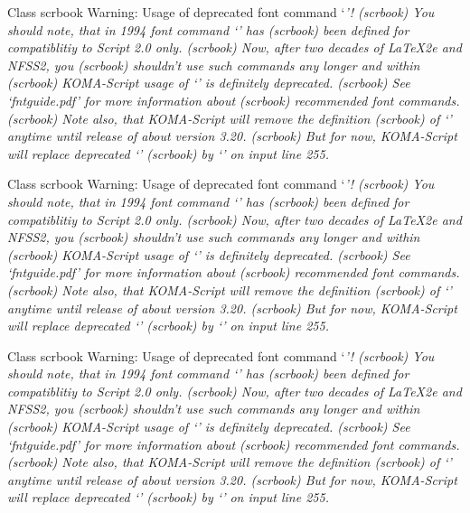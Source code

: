Class scrbook Warning: Usage of deprecated font command `\it'!
(scrbook)              You should note, that in 1994 font command `\it' has
(scrbook)              been defined for compatiblitiy to Script 2.0 only.
(scrbook)              Now, after two decades of LaTeX2e and NFSS2, you
(scrbook)              shouldn't use such commands any longer and within
(scrbook)              KOMA-Script usage of `\it' is definitely deprecated.
(scrbook)              See `fntguide.pdf' for more information about
(scrbook)              recommended font commands.
(scrbook)              Note also, that KOMA-Script will remove the definition
(scrbook)              of `\it' anytime until release of about version 3.20.
(scrbook)              But for now, KOMA-Script will replace deprecated `\it'
(scrbook)              by `\normalfont \itshape ' on input line 255.


Class scrbook Warning: Usage of deprecated font command `\it'!
(scrbook)              You should note, that in 1994 font command `\it' has
(scrbook)              been defined for compatiblitiy to Script 2.0 only.
(scrbook)              Now, after two decades of LaTeX2e and NFSS2, you
(scrbook)              shouldn't use such commands any longer and within
(scrbook)              KOMA-Script usage of `\it' is definitely deprecated.
(scrbook)              See `fntguide.pdf' for more information about
(scrbook)              recommended font commands.
(scrbook)              Note also, that KOMA-Script will remove the definition
(scrbook)              of `\it' anytime until release of about version 3.20.
(scrbook)              But for now, KOMA-Script will replace deprecated `\it'
(scrbook)              by `\normalfont \itshape ' on input line 255.


Class scrbook Warning: Usage of deprecated font command `\it'!
(scrbook)              You should note, that in 1994 font command `\it' has
(scrbook)              been defined for compatiblitiy to Script 2.0 only.
(scrbook)              Now, after two decades of LaTeX2e and NFSS2, you
(scrbook)              shouldn't use such commands any longer and within
(scrbook)              KOMA-Script usage of `\it' is definitely deprecated.
(scrbook)              See `fntguide.pdf' for more information about
(scrbook)              recommended font commands.
(scrbook)              Note also, that KOMA-Script will remove the definition
(scrbook)              of `\it' anytime until release of about version 3.20.
(scrbook)              But for now, KOMA-Script will replace deprecated `\it'
(scrbook)              by `\normalfont \itshape ' on input line 255.


